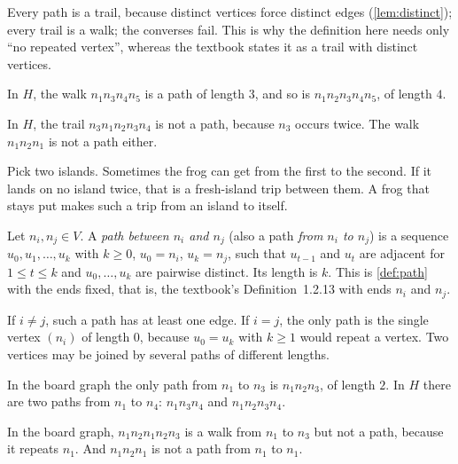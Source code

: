 \begin{remark}
Every path is a trail, because distinct vertices force distinct edges
(\cref{lem:distinct}); every trail is a walk; the converses fail. This is
why the definition here needs only ``no repeated vertex'', whereas the
textbook states it as a trail with distinct vertices.
\end{remark}
\begin{example}
In $H$, the walk $n_1n_3n_4n_5$ is a path of length $3$, and so is
$n_1n_2n_3n_4n_5$, of length $4$.
\end{example}
\begin{nonexample}
In $H$, the trail $n_3n_1n_2n_3n_4$ is not a path, because $n_3$ occurs
twice. The walk $n_1n_2n_1$ is not a path either.
\end{nonexample}

\plainwords{} Pick two islands. Sometimes the frog can get from the first to the
second. If it lands on no island twice, that is a fresh-island trip between
them. A frog that stays put makes such a trip from an island to itself.

\begin{definition}\label{def:pathbetween}
Let $n_i,n_j\in V$. A \emph{path between $n_i$ and $n_j$} (also a path
\emph{from $n_i$ to $n_j$}) is a sequence $u_0,u_1,\dots,u_k$ with
$k\ge 0$, $u_0=n_i$, $u_k=n_j$, such that $u_{t-1}$ and $u_t$ are adjacent
for $1\le t\le k$ and $u_0,\dots,u_k$ are pairwise distinct. Its length is
$k$. This is \cref{def:path} with the ends fixed, that is, the
textbook's Definition~1.2.13 with ends $n_i$ and $n_j$.
\end{definition}

\begin{remark}\label{rem:pathbetween}
If $i\ne j$, such a path has at least one edge. If $i=j$, the only path is
the single vertex $(n_i)$ of length 0, because $u_0=u_k$ with $k\ge 1$
would repeat a vertex. Two vertices may be joined by several paths of
different lengths.
\end{remark}
\begin{example}
In the board graph the only path from $n_1$ to $n_3$ is $n_1n_2n_3$, of
length $2$. In $H$ there are two paths from $n_1$ to $n_4$: $n_1n_3n_4$
and $n_1n_2n_3n_4$.
\end{example}
\begin{nonexample}
In the board graph, $n_1n_2n_1n_2n_3$ is a walk from $n_1$ to $n_3$ but not
a path, because it repeats $n_1$. And $n_1n_2n_1$ is not a path from $n_1$
to $n_1$.
\end{nonexample}

